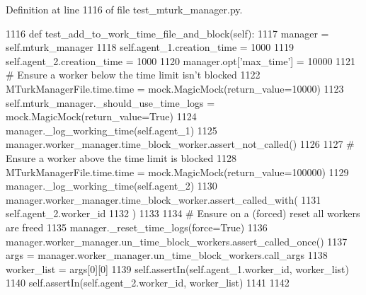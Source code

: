 Definition at line 1116 of file test\+\_\+mturk\+\_\+manager.\+py.


\begin{DoxyCode}
1116     \textcolor{keyword}{def }test\_add\_to\_work\_time\_file\_and\_block(self):
1117         manager = self.mturk\_manager
1118         self.agent\_1.creation\_time = 1000
1119         self.agent\_2.creation\_time = 1000
1120         manager.opt[\textcolor{stringliteral}{'max\_time'}] = 10000
1121         \textcolor{comment}{# Ensure a worker below the time limit isn't blocked}
1122         MTurkManagerFile.time.time = mock.MagicMock(return\_value=10000)
1123         self.mturk\_manager.\_should\_use\_time\_logs = mock.MagicMock(return\_value=\textcolor{keyword}{True})
1124         manager.\_log\_working\_time(self.agent\_1)
1125         manager.worker\_manager.time\_block\_worker.assert\_not\_called()
1126 
1127         \textcolor{comment}{# Ensure a worker above the time limit is blocked}
1128         MTurkManagerFile.time.time = mock.MagicMock(return\_value=100000)
1129         manager.\_log\_working\_time(self.agent\_2)
1130         manager.worker\_manager.time\_block\_worker.assert\_called\_with(
1131             self.agent\_2.worker\_id
1132         )
1133 
1134         \textcolor{comment}{# Ensure on a (forced) reset all workers are freed}
1135         manager.\_reset\_time\_logs(force=\textcolor{keyword}{True})
1136         manager.worker\_manager.un\_time\_block\_workers.assert\_called\_once()
1137         args = manager.worker\_manager.un\_time\_block\_workers.call\_args
1138         worker\_list = args[0][0]
1139         self.assertIn(self.agent\_1.worker\_id, worker\_list)
1140         self.assertIn(self.agent\_2.worker\_id, worker\_list)
1141 
1142 
\end{DoxyCode}
\mbox{\label{classparlai_1_1mturk_1_1core_1_1legacy__2018_1_1test_1_1test__mturk__manager_1_1TestMTurkManagerTimeHandling_a4e974b54630db56e2ebea8ca35461112}} 
